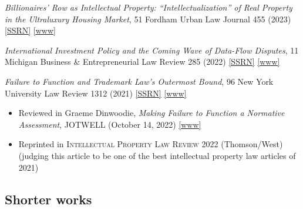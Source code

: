 \documentclass[10pt]{article}
\newenvironment{gnoindent}
{\begin{adjustwidth}{10pt}{50pt}\setlength{\parindent}{0pt}}
{\end{adjustwidth}}
\newcommand{\years}[1]{\marginnote{\scriptsize #1}}
\begin{document}
\begin{gnoindent}
\years{2023} \textit{Billionaires' Row as Intellectual Property: ``Intellectualization'' of Real Property in the Ultraluxury Housing Market}, 51 Fordham Urban Law Journal 455 (2023) \href{https://papers.ssrn.com/sol3/papers.cfm?abstract_id=4504960}{[SSRN]} \href{https://ir.lawnet.fordham.edu/cgi/viewcontent.cgi?article=2955&context=ulj}{[www]} \par
\medskip
\years{2022} {\textit{International Investment Policy and the Coming Wave of Data-Flow Disputes}, 11 Michigan Business \& Entrepreneurial Law Review 285 (2022) \href{https://papers.ssrn.com/sol3/papers.cfm?abstract_id=3917552}{[SSRN]} \href{https://repository.law.umich.edu/cgi/viewcontent.cgi?article=1131&context=mbelr}{[www]}} \par 
\medskip
\years{2021} {\textit{Failure to Function and Trademark Law’s Outermost Bound}, 96 New York University Law Review 1312 (2021) \href{https://papers.ssrn.com/sol3/papers.cfm?abstract_id=3780255}{[SSRN]} \href{https://www.nyulawreview.org/wp-content/uploads/2021/10/Cuatrecasas-ONLINE.pdf}{[www]}} \par
\smallskip
\begin{itemize}
\item Reviewed in Graeme Dinwoodie, \textit{Making Failure to Function a Normative Assessment}, JOTWELL (October 14, 2022) \href{https://ip.jotwell.com/making-failure-to-function-a-normative-assessment/}{[www]}
\item Reprinted in \textsc{Intellectual Property Law Review} 2022 (Thomson/West) (judging this article to be one of the best intellectual property law articles of 2021)
\end{itemize}
\end{gnoindent}

\subsection*{Shorter works}
\end{document}
